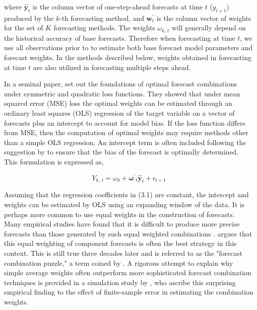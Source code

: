 \documentclass[
a4paper, %
12pt, %
]{CascadeAnalyticsWPS}
\begin{document}
where $\hat{\mathbf{{y}}}_{t}$ is the column vector of one-step-ahead forecasts at time $t$ ($y_{t +1}$) produced by the $k$-th forecasting method, and $\mathbf{w}^{\prime}_{t}$ is the column vector of weights for the set of $K$ forecasting methods. The weights $\omega_{k,\,t}$ will generally depend on the historical accuracy of base forecasts.
Therefore when forecasting at time $t$, we use all observations prior to to estimate both base forecast model parameters and forecast weights. In the methods described below, weights obtained in forecasting at time $t$ are also utilized in forecasting multiple steps ahead.

In a seminal paper, \cite{granger84} set out the foundations of optimal forecast combinations under symmetric and quadratic loss functions. They showed that under mean squared error (MSE) loss the optimal weights can be estimated through an ordinary least squares (OLS) regression of the target variable on a vector of forecasts plus an intercept to account for model bias. If the loss function differs from MSE, then the computation of optimal weights may require methods other than a simple OLS regression, An intercept term is often included following the suggestion by \cite{granger84} to ensure that the bias of the forecast is optimally determined. This formulation is expressed as,

\begin{equation}
	Y_{k, \, t} = \omega_{0} + \bm{\omega^{\prime}}_{t}\hat{\mathbf{{y}}}_{t} + \epsilon_{t+1}
\end{equation}

Assuming that the regression coefficients in (3.1) are constant, the intercept and weights can be estimated by OLS using an expanding window of the data. It is perhaps more common to use equal weights in the construction of forecasts. Many empirical studies have found that it is difficult to produce more precise forecasts than those generated by such equal weighted combinations \cite{gaglianone2014}. \cite{clemen89} argues that this equal weighting of component forecasts is often the best strategy in this context. This is still true three decades later and is referred to as the "forecast combination puzzle," a term coined by \cite{stock_combination_2004}. A rigorous attempt to explain why simple average weights often outperform more sophisticated forecast combination techniques is provided in a simulation study by \cite{smith2009}, who ascribe this surprising empirical
finding to the effect of finite-sample error in estimating the combination weights.
\end{document}
